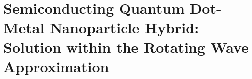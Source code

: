 \chapter{Semiconducting Quantum Dot-Metal Nanoparticle Hybrid: Solution within the Rotating Wave Approximation}\label{app:sqd-mnp}
